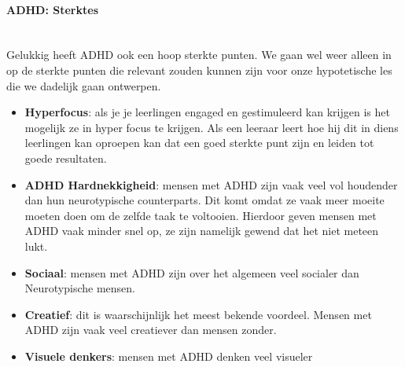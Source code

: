                 \bigskip
                \noindent\paragraph{ADHD: Sterktes}\\
                    Gelukkig heeft ADHD ook een hoop sterkte punten. We gaan wel weer alleen in op de sterkte punten die relevant zouden kunnen zijn voor onze hypotetische les die we dadelijk gaan ontwerpen.
                    \begin{itemize}
                    
                        \item \textbf{Hyperfocus}:
                            als je je leerlingen engaged en gestimuleerd kan krijgen is het mogelijk ze in hyper focus te krijgen. Als een leeraar leert hoe hij dit in diens leerlingen kan oproepen kan dat een goed sterkte punt zijn en leiden tot goede resultaten.

                        \item \textbf{ADHD Hardnekkigheid}:
                            mensen met ADHD zijn vaak veel vol houdender dan hun neurotypische counterparts. Dit komt omdat ze vaak meer moeite moeten doen om de zelfde taak te voltooien. Hierdoor geven mensen met ADHD vaak minder snel op, ze zijn namelijk gewend dat het niet meteen lukt.\cite{ADHD-resilience}

                        \item \textbf{Sociaal}: 
                            mensen met ADHD zijn over het algemeen veel socialer dan Neurotypische mensen. 

                        \item \textbf{Creatief}: 
                            dit is waarschijnlijk het meest bekende voordeel. Mensen met ADHD zijn vaak veel creatiever dan mensen zonder.\cite{ADHD-creativity}

                        \item \textbf{Visuele denkers}: 
                        mensen met ADHD denken veel visueler
                        
                    \end{itemize}
                    
